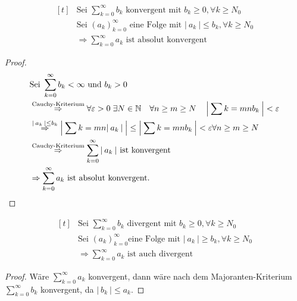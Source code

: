 \documentclass[a4paper,titlepage,oneside]{article}
\def\N{\ensuremath{\mathbb{N}} }
\renewcommand{\epsilon}{\ensuremath{\varepsilon} }
\def\WSP{\text{Widerspruch! }}
\def\sp{\hspace{0,1cm}}
\newcommand{\suminf}[2][n]{\ensuremath{\sum_{#1= 0}^{\infty}{#2}}}
\newcommand{\abs}[1]{\ensuremath{\left|\:#1\:\right|}}
\theoremstyle{thmstyle}
\begin{document}
\begin{subsatz}
\[\begin{aligned}[t]
&\text{Sei } \suminf[k]{b_k} \text{ konvergent mit } b_k \ge 0 , \forall k \ge N_0 \\
&\text{Sei } (a_k)_{k=0}^{\infty} \text{ eine Folge mit } \abs{a_k} \le b_k , \forall k \ge N_0 \\
&\Rightarrow \suminf[k]{a_k} \text{ ist absolut konvergent}
\end{aligned}\]

\begin{proof}
\[\begin{aligned}[t]
&\text{Sei } \suminf[k]{b_k} < \infty \text{ und } b_k > 0 \\
&\overset{\text{Cauchy-Kriterium}}{\Rightarrow} \forall \epsilon > 0 \sp \exists N \in \N \quad \forall n \ge m \ge N \quad \abs{\sum{k=m}{n}{b_k}} < \epsilon \\
&\overset{\abs{a_k} \le b_k}{\Rightarrow} \abs{\sum{k=m}{n}{\abs{a_k}}} \le \abs{\sum{k=m}{n}{b_k}} < \epsilon \forall n \ge m \ge N \\
&\overset{\text{Cauchy-Kriterium}}{\Rightarrow} \suminf[k]{\abs{a_k}} \text{ ist konvergent} \\
&\Rightarrow \suminf[k]{a_k}\text{ ist absolut konvergent.}
\end{aligned}\]
\end{proof}
\end{subsatz}

\begin{subkorr}
\[\begin{aligned}[t]
&\text{Sei } \suminf[k]{b_k} \text{ divergent mit } b_k \ge 0 , \forall k \ge N_0 \\
&\text{Sei } (a_k)_{k=0}^{\infty} \text{eine Folge mit } \abs{a_k} \ge b_k , \forall k \ge N_0 \\
&\Rightarrow \suminf[k]{a_k} \text{ ist auch divergent}
\end{aligned}\]

\begin{proof}
Wäre \(\suminf[k]{a_k}\) konvergent, dann wäre nach dem Majoranten-Kriterium \(\suminf[k]{b_k}\) konvergent, da \(\abs{b_k} \le a_k\). \WSP
\end{proof}
\end{subkorr}
\end{document}
